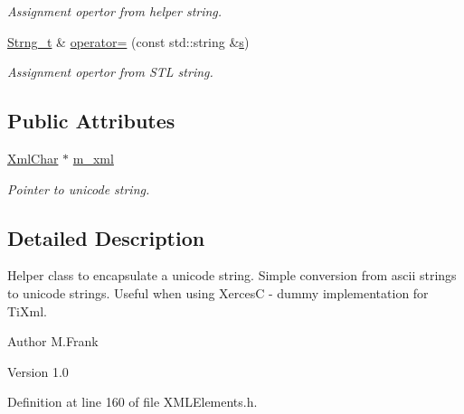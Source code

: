 \begin{DoxyCompactItemize}
\begin{DoxyCompactList}\small\item\em Assignment opertor from helper string. \item\end{DoxyCompactList}\item 
\hyperlink{class_d_d4hep_1_1_x_m_l_1_1_strng__t}{Strng\_\-t} \& \hyperlink{class_d_d4hep_1_1_x_m_l_1_1_strng__t_ae37ccdb03f29e5e501bb050778efa386}{operator=} (const std::string \&\hyperlink{_volumes_8cpp_a17ca6bfc8040d695d3cada22a4763d40}{s})
\begin{DoxyCompactList}\small\item\em Assignment opertor from STL string. \item\end{DoxyCompactList}\end{DoxyCompactItemize}
\subsection*{Public Attributes}
\begin{DoxyCompactItemize}
\item 
\hyperlink{namespace_d_d4hep_1_1_x_m_l_a09e5d9cc86ed782f6826dfe0778c1815}{XmlChar} $\ast$ \hyperlink{class_d_d4hep_1_1_x_m_l_1_1_strng__t_a09fc5214cd993d1c0a7678c5a85850a8}{m\_\-xml}
\begin{DoxyCompactList}\small\item\em Pointer to unicode string. \item\end{DoxyCompactList}\end{DoxyCompactItemize}


\subsection{Detailed Description}
Helper class to encapsulate a unicode string. Simple conversion from ascii strings to unicode strings. Useful when using XercesC -\/ dummy implementation for TiXml.

\begin{DoxyAuthor}{Author}
M.Frank 
\end{DoxyAuthor}
\begin{DoxyVersion}{Version}
1.0 
\end{DoxyVersion}


Definition at line 160 of file XMLElements.h.

